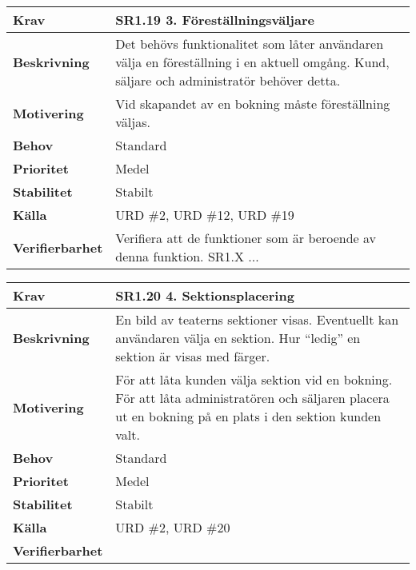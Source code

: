 \documentclass[a4paper, twoside, 11pt, titlepage]{article}
\begin{document}
	\begin{tabular} { p{2.6cm} p{12.5cm} }
		\hline
		\sffamily\textbf{Krav} & \sffamily\textbf{SR1.19 3. Föreställningsväljare } \\
		\hline
		\sffamily\textbf{Beskrivning} & Det behövs funktionalitet som låter användaren välja en föreställning i en aktuell omgång. Kund, säljare och administratör behöver detta.  \\
		\hline
		\sffamily\textbf{Motivering} & Vid skapandet av en bokning måste föreställning väljas.  \\
		\hline
		\sffamily\textbf{Behov} & Standard  \\
		\hline
		\sffamily\textbf{Prioritet} & Medel  \\
		\hline
		\sffamily\textbf{Stabilitet} & Stabilt  \\
		\hline
		\sffamily\textbf{Källa} & URD \#2, URD \#12, URD \#19  \\
		\hline
		\sffamily\textbf{Verifierbarhet} & Verifiera att de funktioner som är beroende av denna funktion. SR1.X ...  \\
		\hline
	\end{tabular}
	\vspace{6mm}

	\begin{tabular} { p{2.6cm} p{12.5cm} }
		\hline
		\sffamily\textbf{Krav} & \sffamily\textbf{SR1.20 4. Sektionsplacering } \\
		\hline
		\sffamily\textbf{Beskrivning} & En bild av teaterns sektioner visas. Eventuellt kan användaren välja en sektion. Hur ``ledig'' en sektion är visas med färger.  \\
		\hline
		\sffamily\textbf{Motivering} & För att låta kunden välja sektion vid en bokning. För att låta administratören och säljaren placera ut en bokning på en plats i den sektion kunden valt.  \\
		\hline
		\sffamily\textbf{Behov} & Standard  \\
		\hline
		\sffamily\textbf{Prioritet} & Medel  \\
		\hline
		\sffamily\textbf{Stabilitet} & Stabilt  \\
		\hline
		\sffamily\textbf{Källa} & URD \#2, URD \#20  \\
		\hline
		\sffamily\textbf{Verifierbarhet} &   \\
		\hline
	\end{tabular}
	\vspace{6mm}
\end{document}
